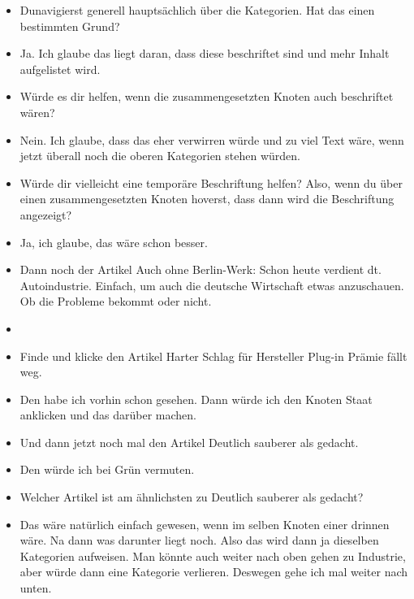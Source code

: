 {\begin{itemize}[]
            \item {} Dunavigierst generell hauptsächlich über die Kategorien. Hat das einen bestimmten Grund?
            \item {} Ja. Ich glaube das liegt daran, dass diese beschriftet sind und mehr Inhalt aufgelistet wird.
            \item {} Würde es dir helfen, wenn die zusammengesetzten Knoten auch beschriftet wären?
            \item {} Nein. Ich glaube, dass das eher verwirren würde und zu viel Text wäre, wenn jetzt überall noch die oberen Kategorien stehen würden.
            \item {} Würde dir vielleicht eine temporäre Beschriftung helfen? Also, wenn du über einen zusammengesetzten Knoten hoverst, dass dann wird die Beschriftung angezeigt?
            \item {} Ja, ich glaube, das wäre schon besser.
            \item {} Dann noch der Artikel \flqq Auch ohne Berlin-Werk: Schon heute verdient dt. Autoindustrie\frqq{}.
                  Einfach, um auch die deutsche Wirtschaft etwas anzuschauen.
                  Ob die Probleme bekommt oder nicht.
            \item {}
            \item {} Finde und klicke den Artikel \flqq Harter Schlag für Hersteller Plug-in Prämie fällt weg\frqq{}.
            \item {} Den habe ich vorhin schon gesehen.
                  Dann würde ich den Knoten Staat anklicken und das darüber machen.
            \item {} Und dann jetzt noch mal den Artikel \flqq Deutlich sauberer als gedacht\frqq{}.
            \item {} Den würde ich bei Grün vermuten.
            \item {} Welcher Artikel ist am ähnlichsten zu \flqq Deutlich sauberer als gedacht\frqq{}?
            \item {} Das wäre natürlich einfach gewesen, wenn im selben Knoten einer drinnen wäre.
                  Na dann was darunter liegt noch. Also das wird dann ja dieselben Kategorien aufweisen.
                  Man könnte auch weiter nach oben gehen zu Industrie, aber würde dann eine Kategorie verlieren.
                  Deswegen gehe ich mal weiter nach unten.

\end{itemize}}
